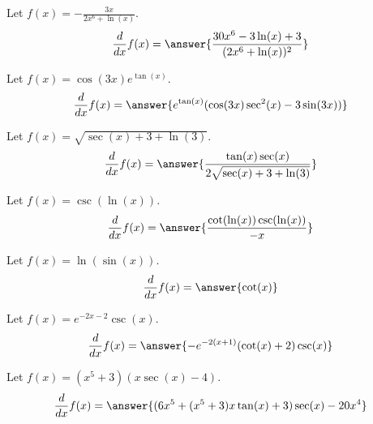 \documentclass{ximera}
\begin{document}
\begin{shuffle}


\begin{exercise}
Let $f(x)=-\frac{3 x}{2 x^6+\ln (x)}$.
\[
\ddx f(x) = \answer{\frac{30 x^6-3 \ln (x)+3}{(2 x^6+\ln (x))^2}}
\]
\end{exercise}

\begin{exercise}
Let $f(x)=\cos (3 x) e^{\tan (x)}$.
\[
\ddx f(x) = \answer{e^{\tan (x)} (\cos (3 x) \sec ^2(x)-3 \sin (3 x))}
\]
\end{exercise}

\begin{exercise}
Let $f(x)=\sqrt{\sec (x)+3+\ln (3)}$.
\[
\ddx f(x) = \answer{\frac{\tan (x) \sec (x)}{2 \sqrt{\sec (x)+3+\ln (3)}}}
\]
\end{exercise}

\begin{exercise}
Let $f(x)=\csc (\ln (x))$.
\[
\ddx f(x) = \answer{\frac{\cot (\ln (x)) \csc (\ln (x))}{-x}}
\]
\end{exercise}

\begin{exercise}
Let $f(x)=\ln (\sin (x))$.
\[
\ddx f(x) = \answer{\cot (x)}
\]
\end{exercise}

\begin{exercise}
Let $f(x)=e^{-2 x-2} \csc (x)$.
\[
\ddx f(x) = \answer{-e^{-2 (x+1)} (\cot (x)+2) \csc (x)}
\]
\end{exercise}


\begin{exercise}
Let $f(x)=(x^5+3) (x \sec (x)-4)$.
\[
\ddx f(x) = \answer{(6 x^5+(x^5+3) x \tan (x)+3) \sec (x)-20 x^4}
\]
\end{exercise}


\end{shuffle}
\end{document}
